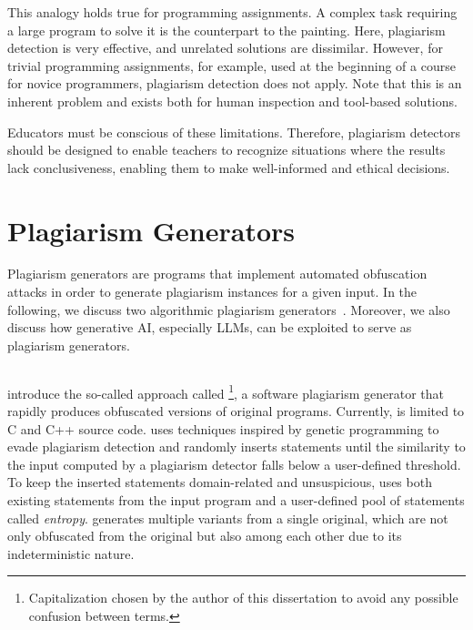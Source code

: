 This analogy holds true for programming assignments. A complex task requiring a large program to solve it is the counterpart to the painting. Here, plagiarism detection is very effective, and unrelated solutions are dissimilar. However, for trivial programming assignments, for example, used at the beginning of a course for novice programmers, plagiarism detection does not apply. Note that this is an inherent problem and exists both for human inspection and tool-based solutions.  

Educators must be conscious of these limitations. Therefore, plagiarism detectors should be designed to enable teachers to recognize situations where the results lack conclusiveness, enabling them to make well-informed and ethical decisions.

\section{Plagiarism Generators}
Plagiarism generators are programs that implement automated obfuscation attacks in order to generate plagiarism instances for a given input.
In the following, we discuss two algorithmic plagiarism generators~\cite{DevoreMcDonald2020, Broedel2023}. Moreover, we also discuss how generative AI, especially \acp{LLM}, can be exploited to serve as plagiarism generators.

\subsection{\mossad}\label{sec:foundations-mossad}
\textcite{DevoreMcDonald2020} introduce the so-called approach called \mossad\footnote{Capitalization chosen by the author of this dissertation to avoid any possible confusion between terms.}, a software plagiarism generator that rapidly produces obfuscated versions of original programs. Currently, \mossad is limited to C and C++ source code.
\mossad uses techniques inspired by genetic programming to evade plagiarism detection and randomly inserts statements until the similarity to the input computed by a plagiarism detector falls below a user-defined threshold. To keep the inserted statements domain-related and unsuspicious, \mossad uses both existing statements from the input program and a user-defined pool of statements called \textit{entropy}.
\mossad generates multiple variants from a single original, which are not only obfuscated from the original but also among each other due to its indeterministic nature.


